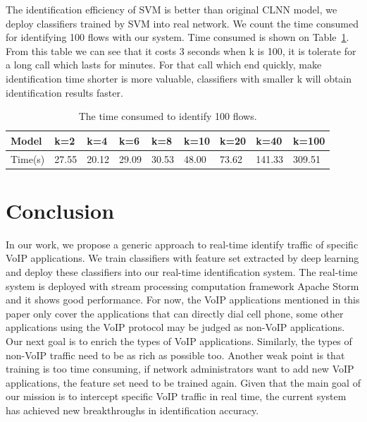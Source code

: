 \documentclass[conference]{IEEEtran}
\begin{document}
The identification efficiency of SVM is better than original CLNN model, we deploy classifiers trained by SVM into real network. We count the time consumed for identifying 100 flows with our system. Time consumed is shown on Table~\ref{tab:time4folws}. From this table we can see that it costs 3 seconds when k is 100, it is tolerate for a long call which lasts for minutes. For that call which end quickly, make identification time shorter is more valuable, classifiers with smaller k will obtain identification results faster.
\begin{table}
  \caption{The time consumed to identify 100 flows.}
  \label{tab:time4folws}
  \centering
  \begin{tabular}{p{0.7cm}p{0.5cm}p{0.5cm}p{0.5cm}p{0.5cm}p{0.5cm}p{0.5cm}p{0.6cm}p{0.6cm}}
    \hline
    \textbf{Model} & \textbf{k=2} &\textbf{k=4}&\textbf{k=6}&\textbf{k=8}&\textbf{k=10}&\textbf{k=20}&\textbf{k=40}&\textbf{k=100}\\
    \hline
    Time(s)      & 27.55  & 20.12  &29.09&30.53&48.00&73.62&141.33&309.51  \\
    \hline
  \end{tabular}
\end{table}

\section{Conclusion}
\label{sec:conclusion}
In our work, we propose a generic approach to real-time identify traffic of specific VoIP applications. We train classifiers with feature set extracted by deep learning and deploy these classifiers into our real-time identification system. The real-time system is deployed with stream processing computation framework Apache Storm and it shows good performance. For now, the VoIP applications mentioned in this paper only cover the applications that can directly dial cell phone, some other applications using the VoIP protocol may be judged as non-VoIP applications. Our next goal is to enrich the types of VoIP applications. Similarly, the types of non-VoIP traffic need to be as rich as possible too. Another weak point is that training is too time consuming, if network administrators want to add new VoIP applications, the feature set need to be trained again. Given that the main goal of our mission is to intercept specific VoIP traffic in real time, the current system has achieved new breakthroughs in identification accuracy.




\end{document}
